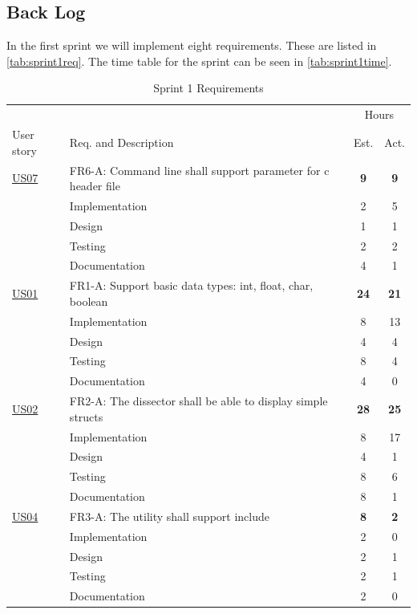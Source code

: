 \subsection{Back Log}
In the first sprint we will implement eight requirements. These are listed in \autoref{tab:sprint1req}.
The time table for the sprint can be seen in \autoref{tab:sprint1time}.

\begin{table}[!htb] \footnotesize \center
\caption{Sprint 1 Requirements \label{tab:sprint1req}}
\begin{tabularx}{\textwidth}{l X c c}
	\toprule
	& & \multicolumn{2}{c}{Hours} \\
	\cmidrule(r){3-4}
	User story & Req. and Description & Est. & Act. \\
	\midrule
	\hyperref[tab:req:stories2]{US07} & FR6-A: Command line shall support parameter for \Gls{c} \gls{header} file & \textbf{9} & \textbf{9} \\
	& Implementation & 2 & 5 \\
	& Design & 1 & 1 \\
	& Testing & 2 & 2 \\
	& Documentation  & 4 & 1 \\
	\addlinespace
 	\hyperref[tab:req:stories1]{US01} & FR1-A: Support basic data types: \gls{int}, \gls{float}, \gls{char}, \gls{boolean} &  \textbf{24}  & \textbf{21} \\
	& Implementation & 8 & 13 \\
	& Design & 4 & 4 \\
	& Testing & 8 & 4 \\
	& Documentation & 4 & 0 \\
	\addlinespace
	\hyperref[tab:req:stories1]{US02} & FR2-A: The \gls{dissector} shall be able to display simple \glspl{struct} & \textbf{28} & \textbf{25} \\
	& Implementation & 8 & 17 \\
	& Design & 4 & 1 \\
	& Testing & 8 & 6 \\
	& Documentation & 8 & 1\\
	\addlinespace
	\hyperref[tab:req:stories1]{US04} & FR3-A: The \gls{utility} shall support \gls{include} & \textbf{8} & \textbf{2} \\
	& Implementation & 2 & 0 \\
	& Design & 2 & 1 \\
	& Testing & 2 & 1 \\
	& Documentation & 2 & 0\\

\end{tabularx}
\end{table}
